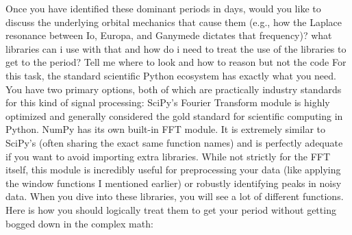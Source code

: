 {}\markdownRendererThematicBreak{}\markdownRendererInterblockSeparator
{}Once you have identified these dominant periods in days, would you like to discuss the underlying orbital mechanics that cause them (e.g., how the Laplace resonance between Io, Europa, and Ganymede dictates that frequency)?\markdownRendererInterblockSeparator
{}\markdownRendererThematicBreak{}\markdownRendererInterblockSeparator
{}
\markdownRendererSectionEnd 
\markdownRendererSectionEnd \markdownRendererSectionBegin
{}\markdownRendererInterblockSeparator
{}what libraries can i use with that and how do i need to treat the use of the libraries to get to the period? Tell me where to look and how to reason but not the code\markdownRendererInterblockSeparator
{}
\markdownRendererSectionEnd \markdownRendererSectionBegin
{}\markdownRendererInterblockSeparator
{}For this task, the standard scientific Python ecosystem has exactly what you need.\markdownRendererInterblockSeparator
{}\markdownRendererSectionBegin
{}\markdownRendererInterblockSeparator
{}You have two primary options, both of which are practically industry standards for this kind of signal processing:\markdownRendererInterblockSeparator
{}\markdownRendererOlBegin
{} SciPy's Fourier Transform module is highly optimized and generally considered the gold standard for scientific computing in Python.\markdownRendererOlItemEnd 
{} NumPy has its own built-in FFT module. It is extremely similar to SciPy's (often sharing the exact same function names) and is perfectly adequate if you want to avoid importing extra libraries.\markdownRendererOlItemEnd 
{} While not strictly for the FFT itself, this module is incredibly useful for preprocessing your data (like applying the window functions I mentioned earlier) or robustly identifying peaks in noisy data.\markdownRendererOlItemEnd 
\markdownRendererOlEnd \markdownRendererInterblockSeparator
{}
\markdownRendererSectionEnd \markdownRendererSectionBegin
{}\markdownRendererInterblockSeparator
{}When you dive into these libraries, you will see a lot of different functions. Here is how you should logically treat them to get your period without getting bogged down in the complex math:\markdownRendererInterblockSeparator
